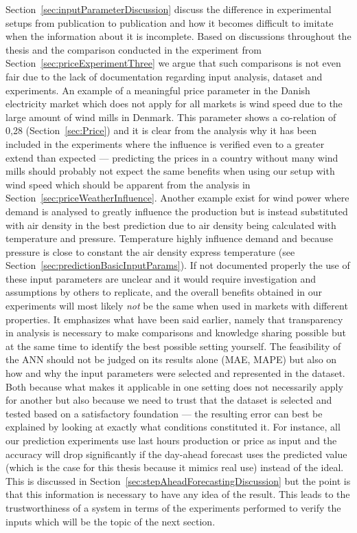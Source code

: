 Section~\ref{sec:inputParameterDiscussion} discuss the difference in experimental setups from publication to publication and how it becomes difficult to imitate when the information about it is incomplete. Based on discussions throughout the thesis and the comparison conducted in the experiment from Section~\ref{sec:priceExperimentThree} we argue that such comparisons is not even fair due to the lack of documentation regarding input analysis, dataset and experiments. An example of a meaningful price parameter in the Danish electricity market which does not apply for all markets is wind speed due to the large amount of wind mills in Denmark. This parameter shows a co-relation of 0,28 (Section~\ref{sec:Price}) and it is clear from the analysis why it has been included in the experiments where the influence is verified even to a greater extend than expected --- predicting the prices in a country without many wind mills should probably not expect the same benefits when using our setup with wind speed which should be apparent from the analysis in Section~\ref{sec:priceWeatherInfluence}. Another example exist for wind power where demand is analysed to greatly influence the production but is instead substituted with air density in the best prediction due to air density being calculated with temperature and pressure. Temperature highly influence demand and because pressure is close to constant the air density express temperature (see Section~\ref{sec:predictionBasicInputParams}). If not documented properly the use of these input parameters are unclear and it would require investigation and assumptions by others to replicate, and the overall benefits obtained in our experiments will most likely \emph{not} be the same when used in markets with different properties. It emphasizes what have been said earlier, namely that transparency in analysis is necessary to make comparisons and knowledge sharing possible but at the same time to identify the best possible setting yourself. The feasibility of the ANN should not be judged on its results alone (MAE, MAPE) but also on how and why the input parameters were selected and represented in the dataset. Both because what makes it applicable in one setting does not necessarily apply for another but also because we need to trust that the dataset is selected and tested based on a satisfactory foundation --- the resulting error can best be explained by looking at exactly what conditions constituted it. For instance, all our prediction experiments use last hours production or price as input and the accuracy will drop significantly if the day-ahead forecast uses the predicted value (which is the case for this thesis because it mimics real use) instead of the ideal. This is discussed in Section~\ref{sec:stepAheadForecastingDiscussion} but the point is that this information is necessary to have any idea of the result. This leads to the trustworthiness of a system in terms of the experiments performed to verify the inputs which will be the topic of the next section.  

